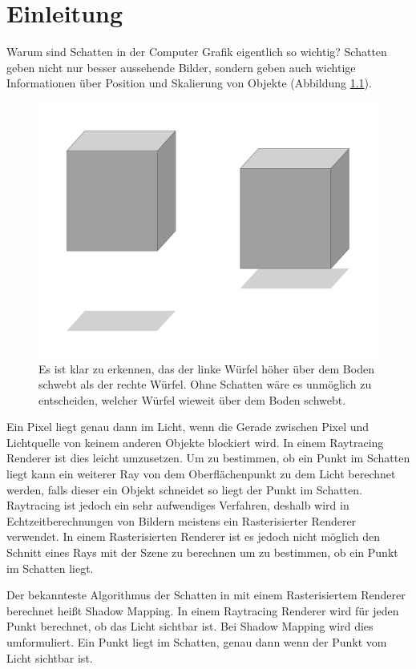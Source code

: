 

\chapter{Einleitung}
\label{ch:Introduction}
Warum sind Schatten in der Computer Grafik eigentlich so wichtig?
Schatten geben nicht nur besser aussehende Bilder, sondern geben auch wichtige Informationen über Position und Skalierung von Objekte
(Abbildung \ref{fig:why-shadows}).

\begin{figure}[H]
	\begin{center}
		\includegraphics[width=.3\textwidth]{res/img/why-shadows.jpg}
    \caption{Es ist klar zu erkennen, das der linke Würfel höher über dem Boden schwebt als der rechte Würfel. 
    Ohne Schatten wäre es unmöglich zu entscheiden, welcher Würfel wieweit über dem Boden schwebt.}
	  \label{fig:why-shadows}
	\end{center}
\end{figure}
Ein Pixel liegt genau dann im Licht, wenn die Gerade zwischen Pixel 
und Lichtquelle von keinem anderen Objekte blockiert wird.
In einem Raytracing Renderer ist dies leicht umzusetzen. 
Um zu bestimmen, ob ein Punkt im Schatten liegt kann ein weiterer Ray von dem Oberflächenpunkt zu dem Licht berechnet werden, 
falls dieser ein Objekt schneidet so liegt der Punkt im Schatten.
Raytracing ist jedoch ein sehr aufwendiges Verfahren, deshalb wird in Echtzeitberechnungen von Bildern meistens
ein Rasterisierter Renderer verwendet.
In einem Rasterisierten Renderer ist es jedoch nicht möglich den Schnitt eines Rays mit der Szene
zu berechnen um zu bestimmen, ob ein Punkt im Schatten liegt.
\par
Der bekannteste Algorithmus der Schatten in mit einem Rasterisiertem Renderer 
berechnet heißt Shadow Mapping.
In einem Raytracing Renderer wird für jeden Punkt berechnet, ob das Licht sichtbar ist.
Bei Shadow Mapping wird dies umformuliert. 
Ein Punkt liegt im Schatten, genau dann wenn der Punkt vom Licht sichtbar ist.
